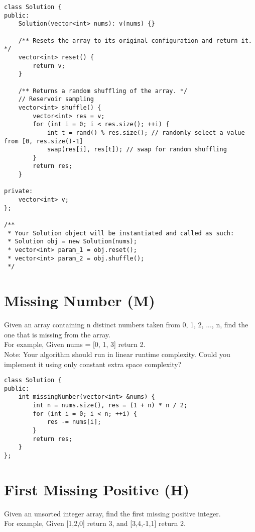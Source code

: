 \begin{lstlisting}
class Solution {
public:
    Solution(vector<int> nums): v(nums) {}
    
    /** Resets the array to its original configuration and return it. */
    vector<int> reset() {
        return v;
    }
    
    /** Returns a random shuffling of the array. */
    // Reservoir sampling
    vector<int> shuffle() {
        vector<int> res = v;
        for (int i = 0; i < res.size(); ++i) {
            int t = rand() % res.size(); // randomly select a value from [0, res.size()-1]
            swap(res[i], res[t]); // swap for random shuffling
        }
        return res;
    }
    
private:
    vector<int> v;
};

/**
 * Your Solution object will be instantiated and called as such:
 * Solution obj = new Solution(nums);
 * vector<int> param_1 = obj.reset();
 * vector<int> param_2 = obj.shuffle();
 */
\end{lstlisting}


\section{Missing Number (M)}
Given an array containing n distinct numbers taken from 0, 1, 2, ..., n, find the one that is missing from the array.\\

For example, 
Given nums = [0, 1, 3] return 2.\\

Note:
Your algorithm should run in linear runtime complexity. Could you implement it using only constant extra space complexity? \\

\begin{lstlisting}
class Solution {
public:
    int missingNumber(vector<int> &nums) {
        int n = nums.size(), res = (1 + n) * n / 2;
        for (int i = 0; i < n; ++i) {
            res -= nums[i];
        }
        return res;
    }
};
\end{lstlisting}


\section{First Missing Positive (H)}
Given an unsorted integer array, find the first missing positive integer.\\

For example,
Given [1,2,0] return 3,
and [3,4,-1,1] return 2.\\

